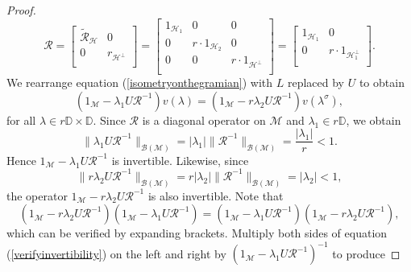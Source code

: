 \documentclass[10pt,a4paper]{amsart}
\begin{document}
\begin{proof}
\begin{equation*}
\mathcal{R} = 
\begin{bmatrix}
	\widetilde{\mathcal{R}}_{\mathcal{H}}   	& 0                \\
	0 		& r_{\mathcal{H}^{\perp}}  	\\
\end{bmatrix} = 
\begin{bmatrix}
	1_{\mathcal{H}_{1}}   	& 0			& 0              \\
	0 		& r\cdot 1_{\mathcal{H}_{2}}		& 0		\\
	0		& 0					& r\cdot 1_{\mathcal{H}^{\perp}}	\\
\end{bmatrix} = 
\begin{bmatrix}
	1_{\mathcal{H}_{1}  } 	& 0                \\
	0 		& r\cdot 1_{\mathcal{H}_{1}^{\perp}}  	\\
\end{bmatrix}.
\end{equation*}
We rearrange equation (\ref{isometryonthegramian}) with $L$ replaced by $U$ to obtain 
\begin{equation}\label{equalitybetweenextension}
(1_{\mathcal{M}}-\lambda_{1}U\mathcal{R}^{-1})v({\lambda}) = (1_{\mathcal{M}}-r\lambda_{2}U\mathcal{R}^{-1})v({\lambda}^{\sigma}),
\end{equation}
for all $\lambda \in r\mathbb{D}\times\mathbb{D}$.
Since $\mathcal{R}$ is a diagonal operator on $\mathcal{M}$ and $\lambda_{1}\in r\mathbb{D}$, we obtain
$$\| \lambda_{1}U\mathcal{R}^{-1}\|_{\mathcal{B(M)}}  = \lvert \lambda_{1} \rvert \| \mathcal{R}^{-1} \|_{\mathcal{B(M)}} = \dfrac{\lvert \lambda_{1} \rvert}{r} < 1. $$
Hence $1_{\mathcal{M}}-\lambda_{1}U\mathcal{R}^{-1}$ is invertible. Likewise, since 
$$ \| r \lambda_{2} U\mathcal{R}^{-1}\|_{\mathcal{B(M)}} =r \lvert \lambda_{2}\rvert \| \mathcal{R}^{-1}\|_{\mathcal{B(M)}} = \lvert \lambda_{2} \rvert < 1,$$ 
the operator $1_{\mathcal{M}}-r\lambda_{2}U\mathcal{R}^{-1}$ is also invertible. Note that 
\begin{equation}\label{verifyinvertibility}
(1_{\mathcal{M}}-r\lambda_{2}U\mathcal{R}^{-1})(1_{\mathcal{M}}-\lambda_{1}U\mathcal{R}^{-1}) = (1_{\mathcal{M}}-\lambda_{1}U\mathcal{R}^{-1})(1_{\mathcal{M}}-r\lambda_{2}U\mathcal{R}^{-1}),
\end{equation}
which can be verified by expanding brackets. Multiply both sides of equation (\ref{verifyinvertibility}) on the left and right by $(1_{\mathcal{M}}-\lambda_{1}U\mathcal{R}^{-1})^{-1}$ to produce

\end{proof}
\end{document}
